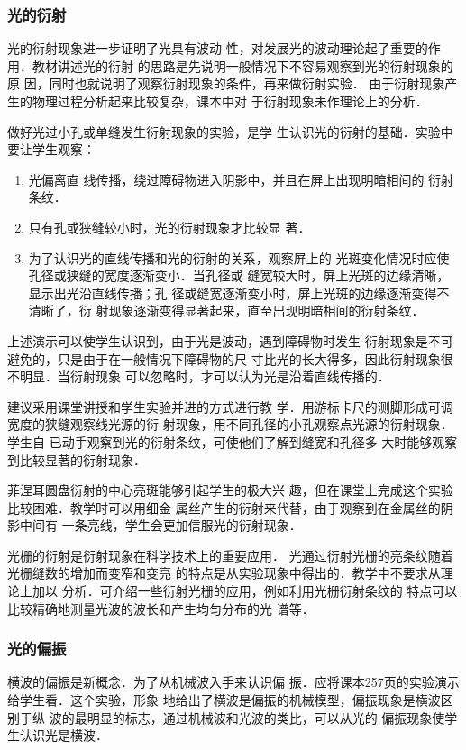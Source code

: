 \subsubsection{光的衍射}

光的衍射现象进一步证明了光具有波动
性，对发展光的波动理论起了重要的作用．教材讲述光的衍射
的思路是先说明一般情况下不容易观察到光的衍射现象的原
因，同时也就说明了观察衍射现象的条件，再来做衍射实验．
由于衍射现象产生的物理过程分析起来比较复杂，课本中对
于衍射现象未作理论上的分析．

做好光过小孔或单缝发生衍射现象的实验，是学
生认识光的衍射的基础．实验中要让学生观察：
\begin{enumerate}
\item 光偏离直
线传播，绕过障碍物进入阴影中，并且在屏上出现明暗相间的
衍射条纹．
\item 只有孔或狭缝较小时，光的衍射现象才比较显
著．
\item 为了认识光的直线传播和光的衍射的关系，观察屏上的
光斑变化情况时应使孔径或狭缝的宽度逐渐变小．当孔径或
缝宽较大时，屏上光斑的边缘清晰，显示出光沿直线传播；孔
径或缝宽逐渐变小时，屏上光斑的边缘逐渐变得不清晰了，衍
射现象逐渐变得显著起来，直至出现明暗相间的衍射条纹．
\end{enumerate}
上述演示可以使学生认识到，由于光是波动，遇到障碍物时发生
衍射现象是不可避免的，只是由于在一般情况下障碍物的尺
寸比光的长大得多，因此衍射现象很不明显．当衍射现象
可以忽略时，才可以认为光是沿着直线传播的．

建议采用课堂讲授和学生实验并进的方式进行教
学．用游标卡尺的测脚形成可调宽度的狭缝观察线光源的衍
射现象，用不同孔径的小孔观察点光源的衍射现象．学生自
已动手观察到光的衍射条纹，可使他们了解到缝宽和孔径多
大时能够观察到比较显著的衍射现象．

菲涅耳圆盘衍射的中心亮斑能够引起学生的极大兴
趣，但在课堂上完成这个实验比较困难．教学时可以用细金
属丝产生的衍射来代替，由于观察到在金属丝的阴影中间有
一条亮线，学生会更加信服光的衍射现象．

光栅的衍射是衍射现象在科学技术上的重要应用．
光通过衍射光栅的亮条纹随着光栅缝数的增加而变窄和变亮
的特点是从实验现象中得出的．教学中不要求从理论上加以
分析．可介绍一些衍射光栅的应用，例如利用光栅衍射条纹的
特点可以比较精确地测量光波的波长和产生均匀分布的光
谱等．

\subsubsection{光的偏振}
横波的偏振是新概念．为了从机械波入手来认识偏
振．应将课本257页的实验演示给学生看．这个实验，形象
地给出了横波是偏振的机械模型，偏振现象是横波区别于纵
波的最明显的标志，通过机械波和光波的类比，可以从光的
偏振现象使学生认识光是横波．

